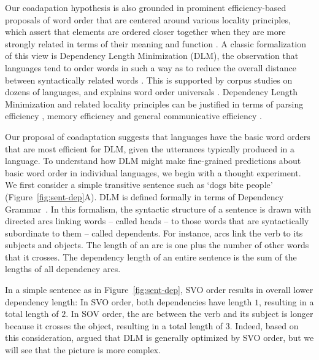 \documentclass[11pt,a4paper]{article}
\begin{document}
Our coadapation hypothesis is also grounded in prominent efficiency-based proposals of word order that are centered around various locality principles, which assert that elements are ordered closer together when they are more strongly related in terms of their meaning and function \citep{behaghel1932deutsche,givon1985iconicity,rijkhoff-word-1986,hawkins-performance-1994}.
A classic formalization of this view is Dependency Length Minimization (DLM), the observation that languages tend to order words in such a way as to reduce the overall distance between syntactically related words \citep{rijkhoff-word-1986,hawkins-performance-1994,liu2008dependency,futrell-cross-linguistic-2015, liu-dependency-2017, futrell2020dependency}.
This is supported by corpus studies on dozens of languages, and explains word order universals \citep{rijkhoff-word-1986, hawkins-performance-1994, hahn2020universals}.
Dependency Length Minimization and related locality principles can be justified in terms of parsing efficiency \citep{hawkins-performance-1994}, memory efficiency \citep{gibson-linguistic-1998} and general communicative efficiency \citep{hahn2020universals}.



Our proposal of coadaptation suggests that languages have the basic word orders that are most efficient for DLM, given the utterances typically produced in a language.
To understand how DLM might make fine-grained predictions about basic word order in individual languages, we begin with a thought experiment.
We first consider a simple transitive sentence such as `dogs bite people' (Figure~\ref{fig:sent-dep}A). 
DLM is defined formally in terms of Dependency Grammar~\citep{hays1964dependency,hudson1984word,melcuk1988dependency,corbett1993heads,tesniere2015elements}.
In this formalism, the syntactic structure of a sentence is drawn with directed arcs linking words -- called heads -- to those words that are syntactically subordinate to them -- called dependents.
For instance, arcs link the verb to its subjects and objects.
The length of an arc is one plus the number of other words that it crosses.
The dependency length of an entire sentence is the sum of the lengths of all dependency arcs.

In a simple sentence as in Figure~\ref{fig:sent-dep}, SVO order results in overall lower dependency length:
In SVO order, both dependencies have length $1$, resulting in a total length of $2$.
In SOV order, the arc between the verb and its subject is longer because it crosses the object, resulting in a total length of $3$.
Indeed, based on this consideration, \cite{ferrer-i-cancho-placement-2017} argued that DLM is generally optimized by SVO order, but we will see that the picture is more complex.
\end{document}
